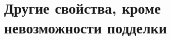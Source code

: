 \documentclass{mrl}
\theoremstyle{definition}
\numberwithin{theorem}{subsection}
\begin{document}



\section{Другие свойства, кроме невозможности подделки}\label{otherProperties}
\end{document}
